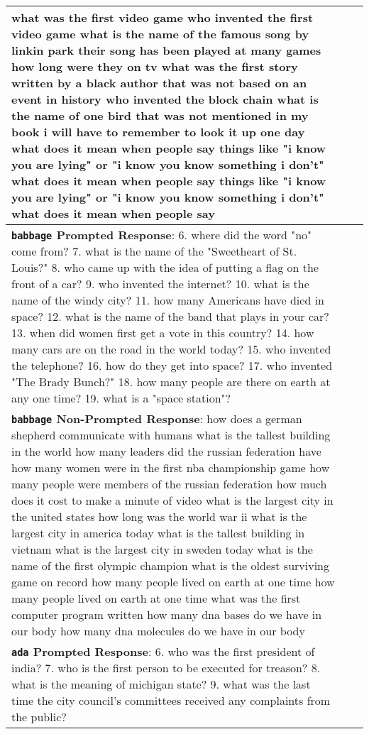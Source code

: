 \documentclass[11pt]{article}
\begin{document}
\begin{table*}
{\begin{tabular}{p{\linewidth}p{\linewidth}p{\linewidth}}
what was the first video game
who invented the first video game
what is the name of the famous song by linkin park their song has been played at many games
how long were they on tv
what was the first story written by a black author that was not based on an event in history
who invented the block chain
what is the name of one bird that was not mentioned in my book i will have to remember to look it up one day
what does it mean when people say things like "i know you are lying" or "i know you know something i don't" what does it mean when people say things like "i know you are lying" or "i know you know something i don't" what does it mean when people say
\\\midrule
\textbf{\texttt{babbage} Prompted Response}: 
6. where did the word "no" come from?
7. what is the name of the "Sweetheart of St. Louis?"
8. who came up with the idea of putting a flag on the front of a car?
9. who invented the internet?
10. what is the name of the windy city?
11. how many Americans have died in space?
12. what is the name of the band that plays in your car?
13. when did women first get a vote in this country?
14. how many cars are on the road in the world today?
15. who invented the telephone?
16. how do they get into space?
17. who invented "The Brady Bunch?"
18. how many people are there on earth at any one time?
19. what is a "space station"?
\\ 
\textbf{\texttt{babbage} Non-Prompted Response}:
how does a german shepherd communicate with humans
what is the tallest building in the world
how many leaders did the russian federation have
how many women were in the first nba championship game
how many people were members of the russian federation
how much does it cost to make a minute of video
what is the largest city in the united states
how long was the world war ii
what is the largest city in america today
what is the tallest building in vietnam 
what is the largest city in sweden today
what is the name of the first olympic champion 
what is the oldest surviving game on record
how many people lived on earth at one time
how many people lived on earth at one time 
what was the first computer program written 
how many dna bases do we have in our body 
how many dna molecules do we have in our body \\\hline
\textbf{\texttt{ada} Prompted Response}: 
6. who was the first president of india?
7. who is the first person to be executed for treason?
8. what is the meaning of michigan state?
9. what was the last time the city council's committees received any complaints from the public?

\end{tabular}}
\end{table*}
\end{document}

